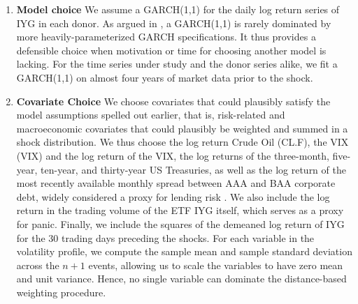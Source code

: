 \documentclass[11pt,3p,review,authoryear]{elsarticle}
\theoremstyle{definition}
\begin{document}
\begin{enumerate}
    \item \textbf{Model choice} We assume a GARCH(1,1) for the daily log return series of IYG in each donor.  As argued in \citet{hansen2005forecast}, a GARCH(1,1) is rarely dominated by more heavily-parameterized GARCH specifications.  It thus provides a defensible choice when motivation or time for choosing another model is lacking.  For the time series under study and the donor series alike, we fit a GARCH(1,1) on almost four years of market data prior to the shock.

    \item \textbf{Covariate Choice} We choose covariates that could plausibly satisfy the model assumptions spelled out earlier, that is, risk-related and macroeconomic covariates that could plausibly be weighted and summed in a shock distribution.  We thus choose the log return Crude Oil (CL.F), the VIX (VIX) and the log return of the VIX, the log returns of the three-month, five-year, ten-year, and thirty-year US Treasuries, as well as the log return of the most recently available monthly spread between AAA and BAA corporate debt, widely considered a proxy for lending risk \citep{goodell2013us, kane1996p}.  We also include the log return in the trading volume of the ETF IYG itself, which serves as a proxy for panic.  Finally, we include the squares of the demeaned log return of IYG for the 30 trading days preceding the shocks.  For each variable in the volatility profile, we compute the sample mean and sample standard deviation across the $n+1$ events, allowing us to scale the variables to have zero mean and unit variance.  Hence, no single variable can dominate the distance-based weighting procedure.


\end{enumerate}
\end{document}
